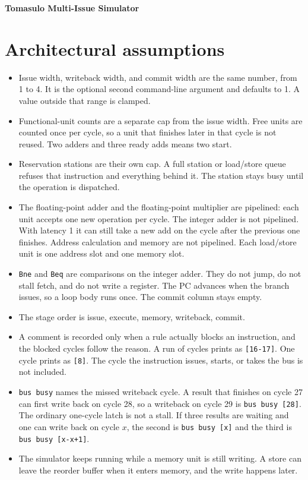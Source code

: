 \documentclass[11pt]{article}
\begin{document}
\begin{center}
{\Large\bfseries Tomasulo Multi-Issue Simulator}
\end{center}

\section{Architectural assumptions}

\begin{itemize}
\item Issue width, writeback width, and commit width are the same number, from 1 to 4. It is the optional second command-line argument and defaults to 1. A value outside that range is clamped.
\item Functional-unit counts are a separate cap from the issue width. Free units are counted once per cycle, so a unit that finishes later in that cycle is not reused. Two adders and three ready adds means two start.
\item Reservation stations are their own cap. A full station or load/store queue refuses that instruction and everything behind it. The station stays busy until the operation is dispatched.
\item The floating-point adder and the floating-point multiplier are pipelined: each unit accepts one new operation per cycle. The integer adder is not pipelined. With latency 1 it can still take a new add on the cycle after the previous one finishes. Address calculation and memory are not pipelined. Each load/store unit is one address slot and one memory slot.
\item \texttt{Bne} and \texttt{Beq} are comparisons on the integer adder. They do not jump, do not stall fetch, and do not write a register. The PC advances when the branch issues, so a loop body runs once. The commit column stays empty.
\item The stage order is issue, execute, memory, writeback, commit.
\item A comment is recorded only when a rule actually blocks an instruction, and the blocked cycles follow the reason. A run of cycles prints as \texttt{[16-17]}. One cycle prints as \texttt{[8]}. The cycle the instruction issues, starts, or takes the bus is not included.
\item \texttt{bus busy} names the missed writeback cycle. A result that finishes on cycle 27 can first write back on cycle 28, so a writeback on cycle 29 is \texttt{bus busy [28]}. The ordinary one-cycle latch is not a stall. If three results are waiting and one can write back on cycle \(x\), the second is \texttt{bus busy [x]} and the third is \texttt{bus busy [x-x+1]}.
\item The simulator keeps running while a memory unit is still writing. A store can leave the reorder buffer when it enters memory, and the write happens later.
\end{itemize}
\end{document}
